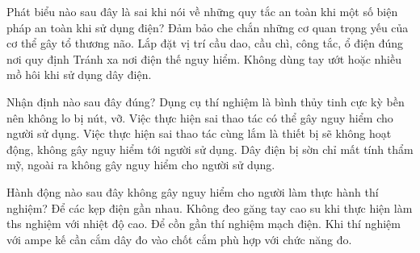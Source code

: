 \begin{ex}
Phát biểu nào sau đây là sai khi nói về những quy tắc an toàn khi một số biện pháp an toàn khi sử dụng điện?
\choice
{\True Đảm bảo che chắn những cơ quan trọng yếu của cơ thể gây tổ thương não.}
{Lắp đặt vị trí cầu dao, cầu chì, công tắc, ổ điện đúng nơi quy định}
{Tránh xa nơi điện thế nguy hiểm.}
{Không dùng tay ướt hoặc nhiều mồ hôi khi sử dụng dây điện.}
\end{ex}


\begin{ex}
Nhận định nào sau đây đúng?
\choice
{Dụng cụ thí nghiệm là bình thủy tinh cực kỳ bền nên không lo bị nút, vỡ.}
{\True Việc thực hiện sai thao tác có thể gây nguy hiểm cho người sử dụng.}
{Việc thực hiện sai thao tác cùng lắm là thiết bị sẽ không hoạt động, không gây nguy hiểm tới người sử dụng.}
{Dây điện bị sờn chỉ mất tính thẩm mỹ, ngoài ra không gây nguy hiểm cho người sử dụng.}
\end{ex}

\begin{ex}
Hành động nào sau đây không gây nguy hiểm cho người làm thực hành thí nghiệm?
\choice
{Để các kẹp điện gần nhau.}
{Không đeo găng tay cao su khi thực hiện làm ths nghiệm với nhiệt độ cao.}
{Để cồn gần thí nghiệm mạch điện.}
{\True Khi thí nghiệm với ampe kế cần cắm dây đo vào chốt cắm phù hợp với chức năng đo.}
\end{ex}


